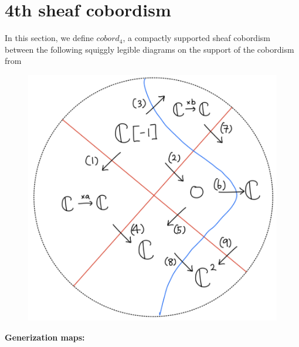 \section{4th sheaf cobordism}
In this section, we define $cobord_4$, a compactly supported sheaf cobordism between the following squiggly legible diagrams on the support of the cobordism from
\begin{figure}[H]
    \centering
    \includegraphics[scale = 0.45]{diagrams/lemma4/21.png}
    \caption{}
    \label{fig:your-label}
\end{figure}
\textbf{Generization maps:}
